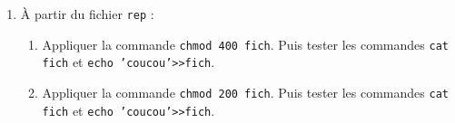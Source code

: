 \documentclass[a4paper,11pt]{exam}
\begin{document}
{\begin{enumerate}
   		\item À partir du fichier \texttt{rep} :
		\begin{enumerate}
		
			\item Appliquer la commande \texttt{chmod 400 fich}. Puis tester les commandes \texttt{cat fich} et \texttt{echo 'coucou'>>fich}.
			
			\item Appliquer la commande \texttt{chmod 200 fich}. Puis tester les commandes \texttt{cat fich} et \texttt{echo 'coucou'>>fich}.
		\end{enumerate}
	\end{enumerate}
}
\end{document}
